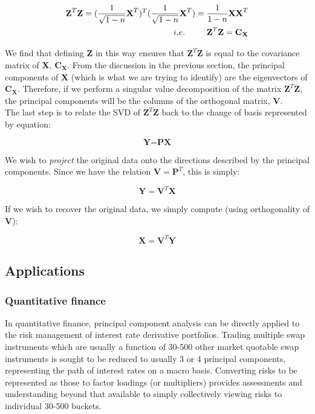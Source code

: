 \documentclass[12pt]{article}
\theoremstyle{plain}
\begin{document}
\begin{equation}
\begin{split}
\textbf{Z}^T\textbf{Z} = (\frac{1}{\sqrt{1-n}}\textbf{X}^T)^T(\frac{1}{\sqrt{1-n}}\textbf{X}^T)= \frac{1}{{1-n}}\textbf{X}\textbf{X}^T \\
i.e.  \hspace{0.9cm} \textbf{Z}^T\textbf{Z} = \textbf{C}_{\textbf{X}}
\end{split}
\end{equation}

We find that defining \textbf{Z} in this way ensures that $\textbf{Z}^T\textbf{Z}$ is equal to the covariance matrix of \textbf{X}, $\textbf{C}_{\textbf{X}}$. From the discussion in the previous section, the principal components of \textbf{X} (which is what we are trying to identify) are the eigenvectors of  $\textbf{C}_{\textbf{X}}$. Therefore, if we perform a singular value decomposition of the matrix $\textbf{Z}^T\textbf{Z}$, the principal components will be the columns of the orthogonal matrix, \textbf{V}.
\\


The last step is to relate the SVD of $\textbf{Z}^T\textbf{Z}$ back to the change of basis represented by equation:


\begin{equation}
\textbf{Y}=\textbf{PX}
\end{equation}

We wish to \emph{project} the original data onto the directions described by the principal components. Since we have the relation $\textbf{V}=\textbf{P}^T$, this is simply:

\begin{equation}
\textbf{Y}=\textbf{V}^T\textbf{X}
\end{equation}

If we wish to recover the original data, we simply compute (using orthogonality of \textbf{V}):

\begin{equation}
\textbf{X}=\textbf{V}^T\textbf{Y}
\end{equation}

\subsection{Applications}

\subsubsection{Quantitative finance}
In quantitative finance, principal component analysis can be directly applied to the risk management of interest rate derivative portfolios. Trading multiple swap instruments which are usually a function of 30-500 other market quotable swap instruments is sought to be reduced to usually 3 or 4 principal components, representing the path of interest rates on a macro basis. Converting risks to be represented as those to factor loadings (or multipliers) provides assessments and understanding beyond that available to simply collectively viewing risks to individual 30-500 buckets.
\\
\end{document}
